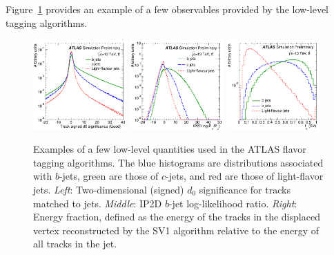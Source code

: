 
Figure~\ref{fig:ftag_low_level_var} provides an example of a few observables provided by the low-level tagging algorithms.

\begin{figure}[!htb]
    \begin{center}
        \includegraphics[width=0.32\textwidth]{figures/chapter3/ftag/ftag_track_d0_sig_ip2d}
        \includegraphics[width=0.32\textwidth]{figures/chapter3/ftag/ftag_ip2d_pb}
        \includegraphics[width=0.32\textwidth]{figures/chapter3/ftag/ftag_sv1_fE}
        \caption{
            Examples of a few low-level quantities used in the ATLAS flavor tagging algorithms.
            The blue histograms are distributions associated with $b$-jets, green are those of $c$-jets, and red
            are those of light-flavor jets.
            \textit{Left}: Two-dimensional (signed) $d_0$ significance for tracks matched to jets.
            \textit{Middle}: IP2D $b$-jet log-likelihood ratio.
            \textit{Right}: Energy fraction, defined as the energy of the tracks in the displaced
                vertex reconstructed by the SV1 algorithm relative to the energy of all tracks in the jet.
        }
        \label{fig:ftag_low_level_var}
    \end{center}
\end{figure}

